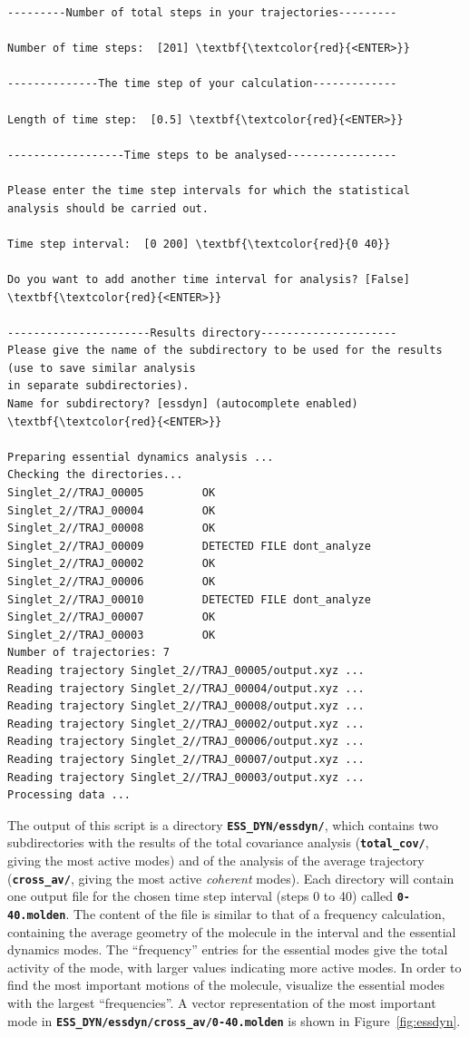 \documentclass[a4paper,11pt,DIV=15,openany]{scrbook}
\newcommand{\ttt}[1]{\textbf{\texttt{#1}}}
\begin{document}
\begin{oframed}
\begin{Verbatim}[commandchars=\\\{\}]
---------Number of total steps in your trajectories---------

Number of time steps:  [201] \textbf{\textcolor{red}{<ENTER>}}

--------------The time step of your calculation-------------

Length of time step:  [0.5] \textbf{\textcolor{red}{<ENTER>}}

------------------Time steps to be analysed-----------------

Please enter the time step intervals for which the statistical analysis should be carried out. 

Time step interval:  [0 200] \textbf{\textcolor{red}{0 40}}

Do you want to add another time interval for analysis? [False] \textbf{\textcolor{red}{<ENTER>}}

----------------------Results directory---------------------
Please give the name of the subdirectory to be used for the results (use to save similar analysis
in separate subdirectories).
Name for subdirectory? [essdyn] (autocomplete enabled) \textbf{\textcolor{red}{<ENTER>}}

Preparing essential dynamics analysis ...
Checking the directories...
Singlet_2//TRAJ_00005         OK
Singlet_2//TRAJ_00004         OK
Singlet_2//TRAJ_00008         OK
Singlet_2//TRAJ_00009         DETECTED FILE dont_analyze
Singlet_2//TRAJ_00002         OK
Singlet_2//TRAJ_00006         OK
Singlet_2//TRAJ_00010         DETECTED FILE dont_analyze
Singlet_2//TRAJ_00007         OK
Singlet_2//TRAJ_00003         OK
Number of trajectories: 7
Reading trajectory Singlet_2//TRAJ_00005/output.xyz ...
Reading trajectory Singlet_2//TRAJ_00004/output.xyz ...
Reading trajectory Singlet_2//TRAJ_00008/output.xyz ...
Reading trajectory Singlet_2//TRAJ_00002/output.xyz ...
Reading trajectory Singlet_2//TRAJ_00006/output.xyz ...
Reading trajectory Singlet_2//TRAJ_00007/output.xyz ...
Reading trajectory Singlet_2//TRAJ_00003/output.xyz ...
Processing data ...
\end{Verbatim}
\end{oframed}

\normalsize
The output of this script is a directory \ttt{ESS\_DYN/essdyn/}, which contains two subdirectories with the results of the total covariance analysis (\ttt{total\_cov/}, giving the most active modes) and of the analysis of the average trajectory (\ttt{cross\_av/}, giving the most active \emph{coherent} modes).
Each directory will contain one output file for the chosen time step interval (steps 0 to 40) called \ttt{0-40.molden}.
The content of the file is similar to that of a frequency calculation, containing the average geometry of the molecule in the interval and the essential dynamics modes.
The ``frequency'' entries for the essential modes give the total activity of the mode, with larger values indicating more active modes.
In order to find the most important motions of the molecule, visualize the essential modes with the largest ``frequencies''.
A vector representation of the most important mode in \ttt{ESS\_DYN/essdyn/cross\_av/0-40.molden} is shown in Figure~\ref{fig:essdyn}.
\end{document}
